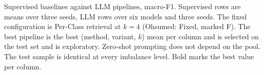 \begin{table}[t]
  \centering
  \scriptsize
  \setlength{\tabcolsep}{3pt}
  \resizebox{\textwidth}{!}{}
  \caption{Supervised baselines against LLM pipelines, macro-F1. Supervised rows are means over three seeds, LLM rows over six models and three seeds. The fixed configuration is Per-Class retrieval at $k = 4$ (Ohsumed: Fixed, marked F). The best pipeline is the best (method, variant, $k$) mean per column and is selected on the test set and is exploratory. Zero-shot prompting does not depend on the pool. The test sample is identical at every imbalance level. Bold marks the best value per column.}
  \label{tab:baselines}
\end{table}
